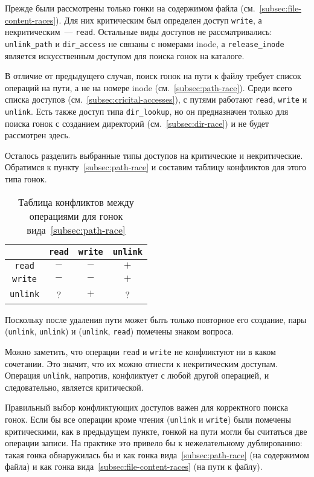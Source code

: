 Прежде были рассмотрены только гонки на содержимом файла (см.~\ref{subsec:file-content-races}). Для них критическим был определен доступ \texttt{write}, а некритическим~--- \texttt{read}. Остальные виды доступов не рассматривались: \texttt{unlink\_path} и \texttt{dir\_access} не связаны с номерами inode, а \texttt{release\_inode} является искусственным доступом для поиска гонок на каталоге.

В отличие от предыдущего случая, поиск гонок на пути к файлу требует список операций на пути, а не на номере inode (см.~\ref{subsec:path-race}). Среди всего списка доступов (см.~\ref{subsec:cricital-accesses}), с путями работают \texttt{read}, \texttt{write} и \texttt{unlink}. Есть также доступ типа \texttt{dir\_lookup}, но он предназначен только для поиска гонок с созданием директорий (см.~\ref{subsec:dir-race}) и не будет рассмотрен здесь.

Осталось разделить выбранные типы доступов на критические и некритические. Обратимся к пункту~\ref{subsec:path-race} и составим таблицу конфликтов для этого типа гонок.

\begin{table}[htbp]
    \centering
    \begin{tabular}{cccc}
        \toprule
        & \texttt{read} & \texttt{write} & \texttt{unlink} \\
        \midrule
        \texttt{read} & $-$ & $-$ & $+$\\
        \texttt{write} & $-$ & $-$ & $+$\\
        \texttt{unlink} & ? & $+$ & ?\\
        \bottomrule
    \end{tabular}
    \caption{Таблица конфликтов между операциями для гонок вида~\ref{subsec:path-race}}
    \label{tab:conflict-table-path-race}
\end{table}

Поскольку после удаления пути может быть только повторное его создание, пары (\texttt{unlink}, \texttt{unlink}) и (\texttt{unlink}, \texttt{read}) помечены знаком вопроса.

Можно заметить, что операции \texttt{read} и \texttt{write} не конфликтуют ни в каком сочетании. Это значит, что их можно отнести к некритическим доступам. Операция \texttt{unlink}, напротив, конфликтует с любой другой операцией, и следовательно, является критической.

Правильный выбор конфликтующих доступов важен для корректного поиска гонок. Если бы все операции кроме чтения (\texttt{unlink} и \texttt{write}) были помечены критическими, как в предыдущем пункте, гонкой на пути могли бы считаться две операции записи. На практике это привело бы к нежелательному дублированию: такая гонка обнаружилась бы и как гонка вида~\ref{subsec:path-race} (на содержимом файла) и как гонка вида~\ref{subsec:file-content-races} (на пути к файлу).

